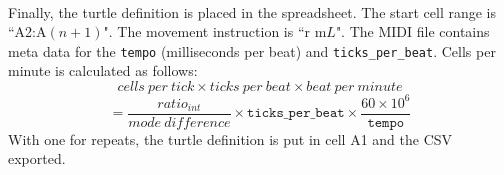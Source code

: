 \paragraph{} Finally, the turtle definition is placed in the spreadsheet. The start cell range is ``A2:A$(n+1)$". The movement instruction is ``r m$L$". The MIDI file contains meta data for the \texttt{tempo} (milliseconds per beat) and \texttt{ticks\_per\_beat}. Cells per minute is calculated as follows:
  $$cells\ per\ tick \times ticks\ per\ beat \times beat\ per\ minute$$
  $$= \frac{ratio_{int}}{mode\ difference} \times \texttt{ticks\_per\_beat} \times \frac{60 \times 10^6}{\texttt{tempo}}$$
With one for repeats, the turtle definition is put in cell A1 and the CSV exported.


